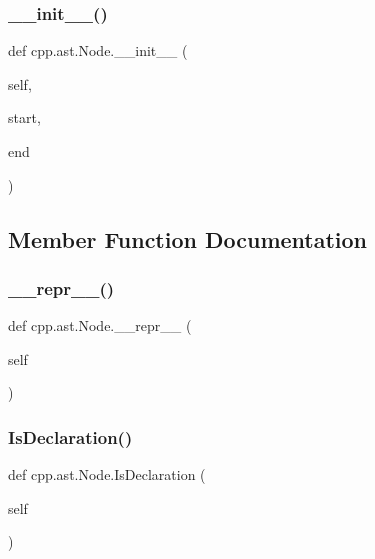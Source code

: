 \subsubsection{\texorpdfstring{\+\_\+\+\_\+init\+\_\+\+\_\+()}{\_\_init\_\_()}}
{\footnotesize\ttfamily def cpp.\+ast.\+Node.\+\_\+\+\_\+init\+\_\+\+\_\+ (\begin{DoxyParamCaption}\item[{}]{self,  }\item[{}]{start,  }\item[{}]{end }\end{DoxyParamCaption})}



\subsection{Member Function Documentation}
\mbox{\label{classcpp_1_1ast_1_1_node_ab89915656a60c7b7c752e5baa607c532}} 
\subsubsection{\texorpdfstring{\+\_\+\+\_\+repr\+\_\+\+\_\+()}{\_\_repr\_\_()}}
{\footnotesize\ttfamily def cpp.\+ast.\+Node.\+\_\+\+\_\+repr\+\_\+\+\_\+ (\begin{DoxyParamCaption}\item[{}]{self }\end{DoxyParamCaption})}

\mbox{\label{classcpp_1_1ast_1_1_node_ab3eca703a79fb65bc25dfbcb7547c79e}} 
\subsubsection{\texorpdfstring{Is\+Declaration()}{IsDeclaration()}}
{\footnotesize\ttfamily def cpp.\+ast.\+Node.\+Is\+Declaration (\begin{DoxyParamCaption}\item[{}]{self }\end{DoxyParamCaption})}

